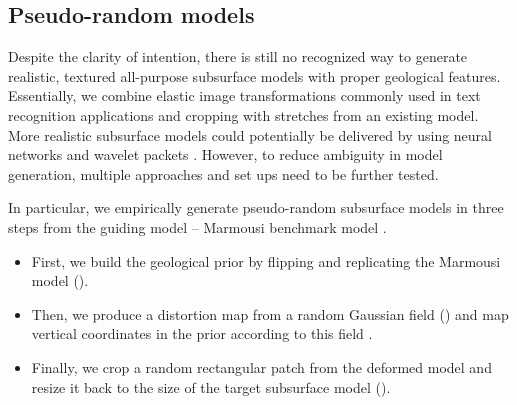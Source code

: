 \documentclass[manuscript]{geophysics}
\begin{document}
\subsection{Pseudo-random models}
Despite the clarity of intention, there is still no recognized way to generate realistic, textured all-purpose subsurface models with proper geological features.
%
Essentially, we combine elastic image transformations commonly used in text recognition applications \citep{simard2003best} and cropping with stretches \citep{sunLowFrequencyExtrapolation2018} from an existing model. More realistic subsurface models could potentially be delivered by using neural networks \citep{ovcharenko2019style} and wavelet packets \citep{kazei2019realistically}. However, to reduce ambiguity in model generation, multiple approaches and set ups need to be further tested.

%
In particular, we empirically generate pseudo-random subsurface models in three steps from the guiding model -- Marmousi benchmark model \citep{marmousi1991}.

\begin{itemize}
	\item First, we build the geological prior by flipping and replicating the Marmousi model ().
	
	\item Then, we produce a distortion map from a random Gaussian field () and map vertical coordinates in the prior according to this field .
	
	\item Finally, we crop a random rectangular patch from the deformed model and resize it back to the size of the target subsurface model ().
\end{itemize} 




\end{document}
